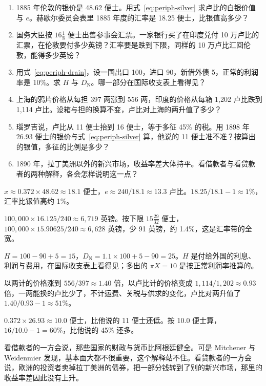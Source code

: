 \begin{selfcheck}
\begin{enumerate}
\item 1885 年伦敦的银价是 48.62 便士。用式~\eqref{eq:periph-silver} 求卢比的白银价值与 $e$。赫歇尔委员会表里 1885 年度的汇率是 18.25 便士，比银值高多少？
\item 国务大臣按 $16\tfrac18$ 便士出售参事会汇票。一家银行买了在印度兑付 10 万卢比的汇票，在伦敦要付多少英镑？汇率要是跌到下限，同样的 10 万卢比汇回伦敦，能得多少英镑？
\item 用式~\eqref{eq:periph-drain}，设一国出口 100，进口 90，新借外债 5，正常的利润率是 10\%。求 $H$ 与 $D_{\text{N}}$。哪一部分在国际收支表上看得见？
\item 上海的鸦片价格从每担 397 两涨到 556 两，印度的价格从每箱 1,202 卢比跌到 1,114 卢比。设箱与担的换算不变，卢比对上海的两升值了多少？
\item 瑙罗吉说，卢比从 11 便士抬到 16 便士，等于多征 45\% 的税。用 1898 年 26.93 便士的银价与式~\eqref{eq:periph-silver} 算，他说的 11 便士准不准？按算出的银值，多征的比例是多少？
\item 1890 年，拉丁美洲以外的新兴市场，收益率差大体持平。看借款者与看贷款者的两种解释，各会怎样说明这一点？
\end{enumerate}
\end{selfcheck}

\begin{answers}
\item $x\approx0.372\times48.62\approx18.1$ 便士，$e\approx240/18.1\approx13.3$ 卢比。$18.25/18.1-1\approx1\%$，汇率比银值高约 1\%。
\item $100{,}000\times16.125/240\approx6{,}719$ 英镑。按下限 $15\tfrac{29}{32}$ 便士，$100{,}000\times15.90625/240\approx6{,}628$ 英镑，少 91 英镑，约 1.4\%，这是汇率带的全宽。
\item $H=100-90+5=15$，$D_{\text{N}}=1.1\times100+5-90=25$。$H$ 是付给外国的利息、利润与费用，在国际收支表上看得见；多出的 $\pi X=10$ 是按正常利润率推算的。
\item 以两计的价格涨到 $556/397\approx1.40$ 倍，以卢比计的价格变成 $1{,}114/1{,}202\approx0.93$ 倍，一两能换的卢比少了，不计运费、关税与供求的变化，卢比对两升值了 $1.40/0.93-1\approx51\%$。
\item $0.372\times26.93\approx10.0$ 便士，比他说的 11 便士还低。按 10.0 便士算，$16/10.0-1=60\%$，比他说的 45\% 还多。
\item 看借款者的一方会说，那些国家的财政与货币比阿根廷健全。可是 Mitchener 与 Weidenmier 发现，基本面大都不很重要，这个解释站不住。看贷款者的一方会说，欧洲的投资者卖掉拉丁美洲的债券，把一部分钱转到了别的新兴市场，那里的收益率差因此没有上升\cite{mitchener2007}。
\end{answers}

